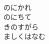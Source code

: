 \documentclass[10pt,b5j]{tarticle} %
\begin{document}
\begin{enumerate}
\begin{minipage}[c]{\blocksize}
        \vspace{\linespace}
        \item~\\
        のにかれ\\
        のにちて\\
        きのすがら\\
        ましくはなむ
    
    \end{minipage}
\end{enumerate} %
\end{document}
